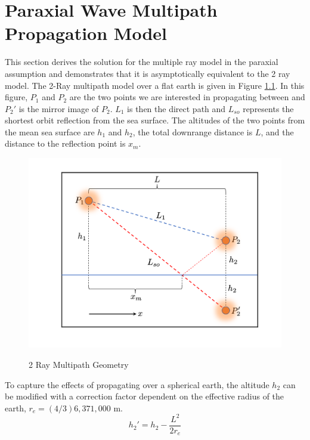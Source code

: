\chapter{Paraxial Wave Multipath Propagation Model}
\label{analytical_propagation}

This section derives the solution for the multiple ray model in the paraxial assumption and demonstrates that it is asymptotically equivalent to the 2 ray model. The 2-Ray multipath model over a flat earth is given in Figure \ref{mp_fig:1}. In this figure, $P_1$ and $P_2$ are the two points we are interested in propagating between and $P_2'$ is the mirror image of $P_2$. $L_1$ is then the direct path and $L_{so}$ represents the shortest orbit reflection from the sea surface. The altitudes of the two points from the mean sea surface are $h_1$ and $h_2$, the total downrange distance is $L$, and the distance to the reflection point is $x_m$.

\begin{figure}[H]
  \begin{center}
\includegraphics[width=5in]{../media/analysis/multipath_2_ray.png}
  \end{center}
  \renewcommand{\baselinestretch}{1} \small\normalsize
  \begin{quote}
    \caption[2 Ray Multipath Geometry]{ 2 Ray Multipath Geometry\label{mp_fig:1}}
  \end{quote}
\end{figure}
\renewcommand{\baselinestretch}{2} \small\normalsize

To capture the effects of propagating over a spherical earth, the altitude $h_2$ can be modified with a correction factor \cite{blake_radar} dependent on the effective radius of the earth, $r_e = (4/3) 6,371,000$ m.
\begin{equation}
h_2' = h_2 - \frac{L^2}{2r_e}
\label{mp_eq:0}
\end{equation}

